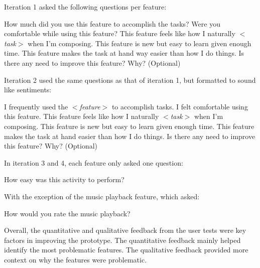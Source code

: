 		Iteration 1 asked the following questions per feature: 
		\begin{outline}
			\1 How much did you use this feature to accomplish the tasks?
			\1 Were you comfortable while using this feature?
			\1 This feature feels like how I naturally \textit{$<$task$>$} when I’m composing.
			\1 This feature is new but easy to learn given enough time.
			\1 This feature makes the task at hand way easier than how I do things.
			\1 Is there any need to improve this feature? Why? (Optional)
		\end{outline}

		Iteration 2 used the same questions as that of iteration 1, but formatted to sound like sentiments: 
		\begin{outline}
			\1 I frequently used the \textit{$<$feature$>$} to accomplish tasks.
			\1 I felt comfortable using this feature.
			\1 This feature feels like how I naturally \textit{$<$task$>$} when I'm composing.
			\1 This feature is new but easy to learn given enough time.
			\1 This feature makes the task at hand easier than how I do things.
			\1 Is there any need to improve this feature? Why? (Optional)	
		\end{outline}

		In iteration 3 and 4, each feature only asked one question: 
			\begin{outline}
				\1 How easy was this activity to perform?
			\end{outline}

		With the exception of the music playback feature, which asked:
			\begin{outline}
				\1 How would you rate the music playback? 
			\end{outline}

		Overall, the quantitative and qualitative feedback from the user tests were key factors in improving the prototype. The quantitative feedback mainly helped identify the most problematic features. The qualitative feedback provided more context on why the features were problematic.


